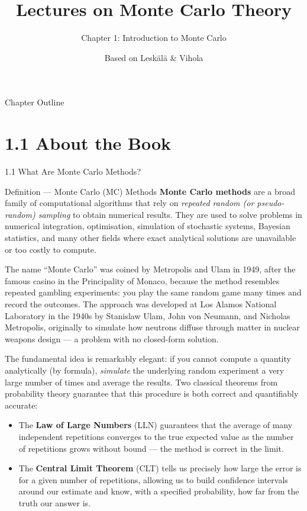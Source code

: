 \documentclass[aspectratio=169,10pt]{beamer}
\title[MC Theory -- Ch.1]{Lectures on Monte Carlo Theory}
\subtitle{Chapter 1: Introduction to Monte Carlo}
\author{Based on Lesk\"{a}l\"{a} \& Vihola}
\date{}
\begin{document}
\begin{frame}
  \titlepage
\end{frame}

\begin{frame}{Chapter Outline}
  \tableofcontents
\end{frame}

\section{1.1 About the Book}

\begin{frame}[allowframebreaks]{1.1 What Are Monte Carlo Methods?}

  \begin{block}{Definition --- Monte Carlo (MC) Methods}
    \textbf{Monte Carlo methods} are a broad family of computational algorithms
    that rely on \emph{repeated random (or pseudo-random) sampling} to obtain
    numerical results.  They are used to solve problems in numerical integration,
    optimisation, simulation of stochastic systems, Bayesian statistics, and
    many other fields where exact analytical solutions are unavailable or too
    costly to compute.
  \end{block}

  The name ``Monte Carlo'' was coined by Metropolis and Ulam in 1949, after the
  famous casino in the Principality of Monaco, because the method resembles
  repeated gambling experiments: you play the same random game many times and
  record the outcomes.  The approach was developed at Los Alamos National
  Laboratory in the 1940s by Stanislaw Ulam, John von Neumann, and Nicholas
  Metropolis, originally to simulate how neutrons diffuse through matter in
  nuclear weapons design --- a problem with no closed-form solution.

  \bigskip
  The fundamental idea is remarkably elegant: if you cannot compute a quantity
  analytically (by formula), \emph{simulate} the underlying random experiment
  a very large number of times and average the results.  Two classical theorems
  from probability theory guarantee that this procedure is both correct and
  quantifiably accurate:

  \begin{itemize}
    \item The \textbf{Law of Large Numbers} (LLN) guarantees that the average
      of many independent repetitions converges to the true expected value as
      the number of repetitions grows without bound --- the method is correct
      in the limit.
    \item The \textbf{Central Limit Theorem} (CLT) tells us precisely how large
      the error is for a given number of repetitions, allowing us to build
      confidence intervals around our estimate and know, with a specified
      probability, how far from the truth our answer is.
  \end{itemize}


\end{frame}
\end{document}

